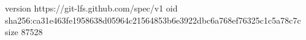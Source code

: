version https://git-lfs.github.com/spec/v1
oid sha256:ca31e463fe1958638d05964c21564853b6e3922dbc6a768ef76325c1c5a78c7c
size 87528
